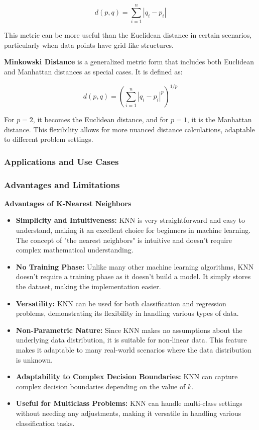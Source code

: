 \documentclass[letterpaper,10pt]{article}
\begin{document}
\[ d(p,q) = \sum_{i=1}^{n} |q_i - p_i| \]

This metric can be more useful than the Euclidean distance in certain scenarios, particularly when data points have grid-like structures. \par
\vspace{5pt}
\textbf{Minkowski Distance} is a generalized metric form that includes both Euclidean and Manhattan distances as special cases. It is defined as:

\[ d(p,q) = (\sum_{i=1}^{n} |q_i - p_i|^p)^{1/p} \]

For \(p = 2\), it becomes the Euclidean distance, and for \(p = 1\), it is the Manhattan distance. This flexibility allows for more nuanced distance calculations, adaptable to different problem settings.

\subsubsection{Applications and Use Cases}
\subsubsection{Advantages and Limitations}
\textbf{Advantages of K-Nearest Neighbors}

\begin{itemize}
    \item \textbf{Simplicity and Intuitiveness:} KNN is very straightforward and easy to understand, making it an excellent choice for beginners in machine learning. The concept of "the nearest neighbors" is intuitive and doesn't require complex mathematical understanding.

    \item \textbf{No Training Phase:} Unlike many other machine learning algorithms, KNN doesn't require a training phase as it doesn't build a model. It simply stores the dataset, making the implementation easier.

    \item \textbf{Versatility:} KNN can be used for both classification and regression problems, demonstrating its flexibility in handling various types of data.

    \item \textbf{Non-Parametric Nature:} Since KNN makes no assumptions about the underlying data distribution, it is suitable for non-linear data. This feature makes it adaptable to many real-world scenarios where the data distribution is unknown.

    \item \textbf{Adaptability to Complex Decision Boundaries:} KNN can capture complex decision boundaries depending on the value of \( k \).

    \item \textbf{Useful for Multiclass Problems:} KNN can handle multi-class settings without needing any adjustments, making it versatile in handling various classification tasks.
\end{itemize}
\end{document}
